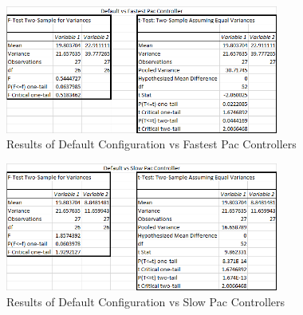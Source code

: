 \documentclass{article}
\begin{document}
\begin{flushleft}
\begin{figure}[h]
	\centering
	\includegraphics[width=0.8\textwidth]{statDefaultVsFastest}
	\caption{Results of Default Configuration vs Fastest Pac Controllers}
\end{figure}

\clearpage

\begin{figure}[h]
	\centering
	\includegraphics[width=0.8\textwidth]{statDefaultVsSlow}
	\caption{Results of Default Configuration vs Slow Pac Controllers}
\end{figure}
\end{flushleft}

\vspace{15mm}
\end{document}
